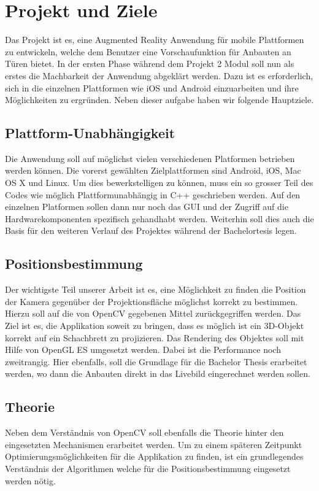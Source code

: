 \documentclass[main.tex]{subfiles}
\begin{document}
\section{Projekt und Ziele}

Das Projekt ist es, eine Augmented Reality Anwendung für mobile Plattformen zu entwickeln, welche dem Benutzer eine Vorschaufunktion für Anbauten an Türen bietet. In der ersten Phase während dem Projekt 2 Modul soll nun als erstes die Machbarkeit der Anwendung abgeklärt werden. Dazu ist es erforderlich, sich in die einzelnen Plattformen wie iOS und Android einzuarbeiten und ihre Möglichkeiten zu ergründen. Neben dieser aufgabe haben wir folgende Hauptziele.

\subsection{Plattform-Unabhängigkeit}
Die Anwendung soll auf möglichst vielen verschiedenen Platformen betrieben werden können. Die vorerst gewählten Zielplattformen sind Android, iOS, Mac OS X und Linux. Um dies bewerkstelligen zu können, muss ein so grosser Teil des Codes wie möglich Plattformunabhängig in C++ geschrieben werden. Auf den einzelnen Platformen sollen dann nur noch das GUI und der Zugriff auf die Hardwarekomponenten spezifisch gehandhabt werden. Weiterhin soll dies auch die Basis für den weiteren Verlauf des Projektes während der Bachelortesis legen.

\subsection{Positionsbestimmung}
Der wichtigste Teil unserer Arbeit ist es, eine Möglichkeit zu finden die Position der Kamera gegenüber der Projektionsfläche möglichst korrekt zu bestimmen. Hierzu soll auf die von OpenCV gegebenen Mittel zurückgegriffen werden. Das Ziel ist es, die Applikation soweit zu bringen, dass es möglich ist ein 3D-Objekt korrekt auf ein Schachbrett zu projizieren. Das Rendering des Objektes soll mit Hilfe von OpenGL ES umgesetzt werden. Dabei ist die Performance noch zweitrangig. Hier ebenfalls, soll die Grundlage für die Bachelor Thesis erarbeitet werden, wo dann die Anbauten direkt in das Livebild eingerechnet werden sollen.

\subsection{Theorie}
Neben dem Verständnis von OpenCV soll ebenfalls die Theorie hinter den eingesetzten Mechanismen erarbeitet werden. Um zu einem späteren Zeitpunkt Optimierungsmöglichkeiten für die Applikation zu finden, ist ein grundlegendes Verständnis der Algorithmen welche für die Positionsbestimmung eingesetzt werden nötig.
\end{document}
